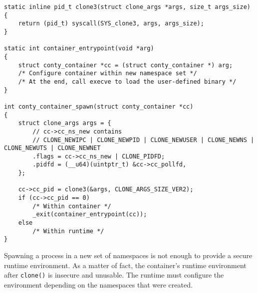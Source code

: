 \begin{lstlisting}[style=c-code-snippets, label={code:implementation/namespaces/clone}, caption={Container instantiation within the runtime using clone3}]
static inline pid_t clone3(struct clone_args *args, size_t args_size)
{
    return (pid_t) syscall(SYS_clone3, args, args_size);
}

static int container_entrypoint(void *arg)
{
    struct conty_container *cc = (struct conty_container *) arg;
    /* Configure container within new namespace set */
    /* At the end, call execve to load the user-defined binary */
}

int conty_container_spawn(struct conty_container *cc)
{
    struct clone_args args = {
        // cc->cc_ns_new contains
        // CLONE_NEWIPC | CLONE_NEWPID | CLONE_NEWUSER | CLONE_NEWNS | CLONE_NEWUTS | CLONE_NEWNET
        .flags = cc->cc_ns_new | CLONE_PIDFD;
        .pidfd = (__u64)(uintptr_t) &cc->cc_pollfd,
    };

    cc->cc_pid = clone3(&args, CLONE_ARGS_SIZE_VER2);
    if (cc->cc_pid == 0) 
        /* Within container */
        _exit(container_entrypoint(cc));
    else 
        /* Within runtime */
}
\end{lstlisting}

Spawning a process in a new set of namespaces is not enough to provide a secure runtime environment.
As a matter of fact, the container's runtime environment after \verb|clone()| is insecure and unusable.
The runtime must configure the environment depending on the namespaces that were created.  

